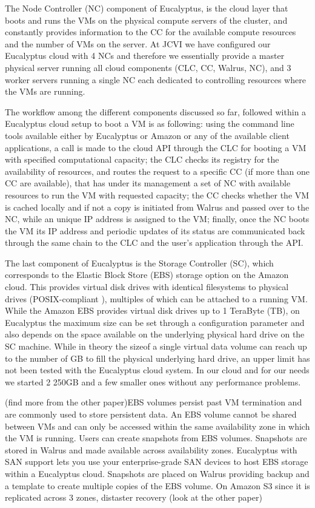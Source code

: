\documentclass[10pt]{bmc_article}
\newenvironment{bmcformat}{\baselineskip20pt\sloppy\setboolean{publ}{false}}{\baselineskip20pt\sloppy}
\begin{document}
\begin{bmcformat}
The Node Controller (NC) component of Eucalyptus, is the cloud layer that boots and runs the VMs on the physical compute servers of the 
cluster, and constantly provides information to the CC for the available compute resources and the number of VMs on the server. At JCVI we 
have configured our Eucalyptus cloud with 4 NCs and therefore we essentially provide a master physical server running all cloud 
components (CLC, CC, Walrus, NC), and 3 worker servers running a single NC each dedicated to controlling resources where the VMs are running. 

The workflow  among the different components discussed so far, followed within a Eucalyptus cloud setup to boot a VM is as following: using the 
command line tools available either by Eucalyptus or Amazon or any of the available client applications, a call is made to the cloud API through
the CLC for booting a VM with specified computational capacity; the CLC checks its registry for the availability of resources, and routes
the request to a specific CC (if more than one CC are available), that has under its management a set of NC with available resources to
run the VM with requested capacity; the CC checks whether the VM is cached locally and if not a copy is initiated from Walrus and passed
over to the NC, while an unique IP address is assigned to the VM; finally, once the NC boots the VM its IP address and periodic updates
of its status are communicated back through the same chain to the CLC and the user's application through the API.

The last component of Eucalyptus is the Storage Controller (SC), which corresponds to the Elastic Block Store (EBS) storage option on the 
Amazon cloud. This provides virtual disk drives with identical filesystems to physical drives (POSIX-compliant \cite{mathur2007new}),  multiples
of which can be attached to a running VM. While the Amazon EBS provides virtual disk drives up to 1 TeraByte (TB), on Eucalyptus the maximum
size can be set through a configuration parameter and also depends on the space available on the underlying physical hard drive on the SC machine. 
While in theory the sizeof a single virtual data volume can reach up to the number of GB to fill the physical underlying  hard drive, an upper
limit has not been tested with the Eucalyptus cloud system. In our cloud and for our needs we started 2 250GB 
and a few smaller ones without any performance problems.

(find more from the other paper)EBS volumes persist past VM termination and are commonly 
used to store persistent data. An EBS volume cannot be shared between VMs and can only be accessed within the 
same availability zone in which the VM is running. Users can create snapshots from EBS volumes. Snapshots are stored
in Walrus and made available across availability zones. Eucalyptus with SAN support lets you use your enterprise-grade 
SAN devices to host EBS storage within a Eucalyptus cloud. Snapshots are placed on Walrus providing backup and a template
to create multiple copies of the EBS volume. On Amazon S3 since it is replicated across 3 zones, distaster recovery (look at the other paper)


\end{bmcformat}
\end{document}
